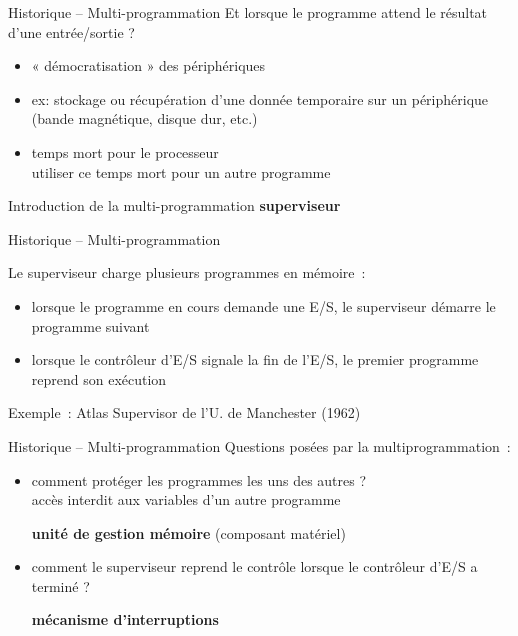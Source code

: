 \begin {frame} {Historique -- Multi-programmation}
    Et lorsque le programme attend le résultat d'une entrée/sortie ?

    \begin {itemize}
	\item « démocratisation » des périphériques
	\item ex: stockage ou récupération d'une donnée temporaire
	    sur un périphérique (bande magnétique, disque dur, etc.)

	\item temps mort pour le processeur \\
	    \implique utiliser ce temps mort pour un autre programme

    \end {itemize}

    \vspace* {3mm}

    Introduction de la multi-programmation \implique \textbf {superviseur}
\end {frame}

\begin {frame} {Historique -- Multi-programmation}

    Le superviseur charge plusieurs programmes en mémoire~:
    \begin {itemize}

	\item lorsque le programme en cours demande une E/S, le
	    superviseur démarre le programme suivant
	\item lorsque le contrôleur d’E/S signale la fin de l’E/S,
	    le premier programme reprend son exécution
    \end {itemize}

    \vspace* {3mm}

    Exemple~: Atlas Supervisor de l'U. de Manchester (1962)
\end {frame}

\begin {frame} {Historique -- Multi-programmation}
    Questions posées par la multiprogrammation~:

    \begin {itemize}
	\item comment protéger les programmes les uns des autres ?
	    \\
	    \implique accès interdit aux variables d'un autre programme

	    \implique \textbf {unité de gestion mémoire} (composant matériel)

	\item comment le superviseur reprend le contrôle
	    lorsque le contrôleur d'E/S a terminé ?

	    \implique \textbf {mécanisme d'interruptions}
    \end {itemize}

\end {frame}

